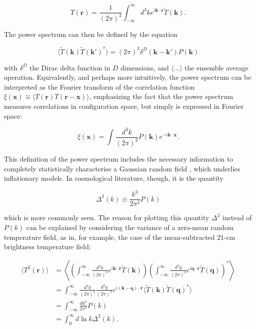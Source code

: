 \documentclass[floats,floatfix,showpacs,amssymb,prd,superscriptaddress,nofootinbib]{revtex4-2} %
\begin{document}
\begin{equation}
    T(\textbf{r}) = \frac{1}{(2 \pi)^3} \int^\infty _{-\infty} d^3 k e^{i \textbf{k} \cdot \textbf{r}} \tilde{T}(\textbf{k}).
\end{equation}

The power spectrum can then be defined by the equation

\begin{equation}
    \langle \tilde{T} (\textbf{k}) \tilde{T} (\textbf{k}') ^{*} \rangle = (2 \pi)^3 \delta^{D}  (\textbf{k} - \textbf{k}') P(\textbf{k})
\end{equation}

\noindent with $\delta^D$ the Dirac delta function in $D$ dimensions, and $\langle ... \rangle$ the ensemble average operation. Equivalently, and perhaps more intuitively, the power spectrum can be interpreted as the Fourier transform of the correlation function $\xi(\textbf{x}) \equiv \langle T(\textbf{r}) T(\textbf{r} - \textbf{x}) \rangle$, emphasizing the fact that the power spectrum measures correlations in configuration space, but simply is expressed in Fourier space:

\begin{equation}
    \xi(\textbf{x}) = \int \frac{d^3 k}{(2 \pi)^3} P(\textbf{k}) e^{-i \textbf{k} \cdot \textbf{x}}.
\end{equation}

This definition of the power spectrum includes the necessary information to completely statistically characterise a Gaussian random field \citep{Coles_2001}, which underlies inflationary models. In cosmological literature, though, it is the quantity 

\begin{equation}
    \Delta^2 (k) \equiv \frac{k^3}{2\pi^2} P(k)
\end{equation}

\noindent which is more commonly seen. The reason for plotting this quantity $\Delta^2$ instead of $P(k)$ can be explained by considering the variance of a zero-mean random temperature field, as in, for example, the case of the mean-subtracted 21-cm brightness temperature field:

\begin{equation}
\begin{split}
    \langle T^2 (\textbf{r}) \rangle
    & = \left\langle \left( \int^\infty _{-\infty} \frac{d^3 k}{(2\pi)^3} e^{i \textbf{k} \cdot \textbf{r}} \tilde{T} (\textbf{k}) \right) \left( \int^\infty _{-\infty} \frac{d^3 q}{(2\pi)^3} e^{i \textbf{q} \cdot \textbf{r}} \tilde{T} (\textbf{q}) \right)^{*} \right\rangle \\
    & = \int^\infty _{-\infty} \frac{d^3 k}{(2\pi)^3} \frac{d^3 q}{(2\pi)^3} e^{i (\textbf{k} - \textbf{q}) \cdot \textbf{r}} \langle \tilde{T} (\textbf{k}) \tilde{T} (\textbf{q})^{*} \rangle \\
    & = \int^\infty _{-\infty} \frac{dk^3}{2\pi^2} P(k) \\
    & = \int^\infty _{0} d \ln k \Delta^2 (k).
\end{split}
\end{equation}
\end{document}
